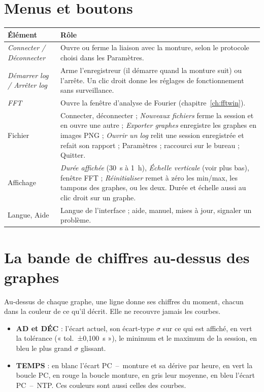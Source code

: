 \section{Menus et boutons}
\label{sec:menus}

\begin{center}
\begin{tabularx}{\textwidth}{lX}
\toprule
\textbf{Élément} & \textbf{Rôle} \\
\midrule
\emph{Connecter / Déconnecter} & Ouvre ou ferme la liaison avec la monture,
selon le protocole choisi dans les Paramètres. \\
\emph{Démarrer log / Arrêter log} & Arme l'enregistreur (il démarre quand la
monture suit) ou l'arrête. Un clic droit donne les réglages de
fonctionnement sans surveillance. \\
\emph{FFT} & Ouvre la fenêtre d'analyse de Fourier
(chapitre~\ref{ch:fftwin}). \\
Fichier & Connecter, déconnecter ; \emph{Nouveaux fichiers} ferme la session
et en ouvre une autre ; \emph{Exporter graphes} enregistre les graphes en
images PNG ; \emph{Ouvrir un log} relit une session enregistrée et refait son
rapport ; Paramètres ; raccourci sur le bureau ; Quitter. \\
Affichage & \emph{Durée affichée} (30~s à 1~h), \emph{Échelle verticale}
(voir plus bas), fenêtre FFT ; \emph{Réinitialiser} remet à zéro les min/max,
les tampons des graphes, ou les deux. Durée et échelle aussi au clic droit sur
un graphe. \\
Langue, Aide & Langue de l'interface ; aide, manuel, mises à jour, signaler un
problème. \\
\bottomrule
\end{tabularx}
\end{center}

\section{La bande de chiffres au-dessus des graphes}
\label{sec:strip}

Au-dessus de chaque graphe, une ligne donne ses chiffres du moment, chacun dans
la couleur de ce qu'il décrit. Elle ne recouvre jamais les courbes.

\begin{itemize}
  \item \textbf{AD et DÉC} : l'écart actuel, son écart-type $\sigma$ sur ce qui est
  affiché, en vert la tolérance (« tol.~±0,100~s »), le minimum et le maximum
  de la session, en bleu le plus grand $\sigma$ glissant.
  \item \textbf{TEMPS} : en blanc l'écart PC~--~monture et sa dérive par heure,
  en vert la boucle PC, en rouge la boucle monture, en gris leur moyenne, en bleu
  l'écart PC~--~NTP. Ces couleurs sont aussi celles des courbes.
\end{itemize}

